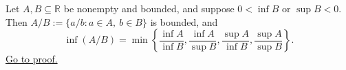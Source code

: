 \begin{theorem}
\label{thm:infimum-quotient-set}
Let $A,B\subseteq\mathbb{R}$ be nonempty and bounded, and suppose
$0<\inf B$ or $\sup B<0$.  Then
$A/B:=\{a/b:a\in A,\ b\in B\}$ is bounded, and
\[
  \inf(A/B)=
  \min\left\{\frac{\inf A}{\inf B},\frac{\inf A}{\sup B},
              \frac{\sup A}{\inf B},\frac{\sup A}{\sup B}\right\}.
\]
\hyperref[prf:infimum-quotient-set]{Go to proof.}
\end{theorem}